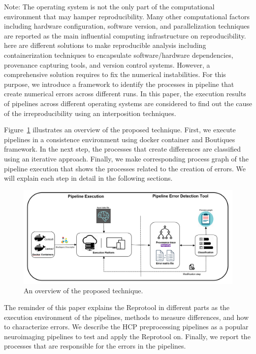 \documentclass{article}
\newcommand{\note}[2]{\color{blue}Note: #1\color{black}}
\begin{document}
{\note{The operating system is not the only part of the computational 
environment that may hamper reproducibility. Many other computational 
factors including hardware configuration, software version, and 
parallelization techniques are reported as 
the main influential computing infrastructure on reproducibility. }

There are different solutions to make reproducible analysis including 
containerization techniques to encapsulate software/hardware 
dependencies, provenance capturing tools, and version control systems. 
However, a comprehensive solution requires to fix the numerical 
instabilities. For this purpose, we introduce a framework to identify 
the processes in pipeline that create numerical errors across different 
runs. In this paper, the execution results of pipelines across 
different operating systems are considered to find out the cause of the 
irreproducibility using an interposition techniques.

Figure~\ref{fig:overview} illustrates an overview of the proposed 
technique. First, we execute pipelines in a consistence environment 
using docker container and Boutiques framework. In the next step, the 
processes that create differences are classified using an iterative 
approach. Finally, we make corresponding process graph of the 
pipeline execution that shows the processes related to the creation of 
errors. We will explain each step in detail in the following sections.

\begin{figure}[H]
\centering
  \includegraphics[scale=0.5]{images/overview.png}
  \caption{An overview of the proposed technique.}
  \label{fig:overview}
\end{figure}

The reminder of this paper explains the Reprotool in different parts as 
the execution environment of the pipelines, methods to measure 
differences, and how to characterize errors. We describe the HCP 
preprocessing pipelines as a popular neuroimaging pipelines to test and 
apply the Reprotool on. Finally, we report the processes that are 
responsible for the errors in the pipelines.


}
\end{document}

